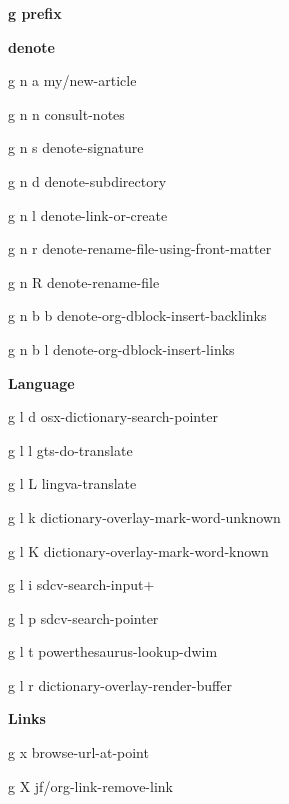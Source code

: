 \documentclass[10pt]{article}
\renewcommand\section[1]{\bigskip\par\textbf{\color{heading}\large#1}\smallskip}
\renewcommand\subsection[1]{\smallskip\par\textbf{\color{heading}#1}}
\begin{document}
\begin{multicols}{4}
  \section{g prefix}
  \subsection{denote}
  \begin{keylist}
    \item[g n a] my/new-article
    \item[g n n] consult-notes
    \item[g n s] denote-signature
    \item[g n d] denote-subdirectory
    \item[g n l] denote-link-or-create
    \item[g n r] denote-rename-file-using-front-matter
    \item[g n R] denote-rename-file
    \item[g n b b] denote-org-dblock-insert-backlinks
    \item[g n b l] denote-org-dblock-insert-links
  \end{keylist}

  \subsection{Language}
  \begin{keylist}
    \item[g l d] osx-dictionary-search-pointer
    \item[g l l] gts-do-translate
    \item[g l L] lingva-translate
    \item[g l k] dictionary-overlay-mark-word-unknown
    \item[g l K] dictionary-overlay-mark-word-known
    \item[g l i] sdcv-search-input+
    \item[g l p] sdcv-search-pointer
    \item[g l t] powerthesaurus-lookup-dwim
    \item[g l r] dictionary-overlay-render-buffer
  \end{keylist}
  \subsection{Links}
  \begin{keylist}
    \item[g x] browse-url-at-point
    \item[g X] jf/org-link-remove-link
  \end{keylist}
\end{multicols}
\end{document}
